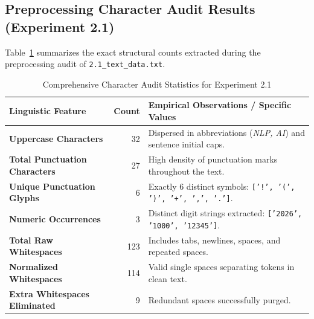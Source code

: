 \subsection{Preprocessing Character Audit Results (Experiment 2.1)}
Table~\ref{tab:exp2_audit_results} summarizes the exact structural counts extracted during the preprocessing audit of \texttt{2.1\_text\_data.txt}.
\begin{table}[H]
\centering
\small
\caption{Comprehensive Character Audit Statistics for Experiment 2.1}
\label{tab:exp2_audit_results}
\begin{tabular}{lrl}
\toprule
\textbf{Linguistic Feature} & \textbf{Count} & \textbf{Empirical Observations / Specific Values} \\
\midrule
\textbf{Uppercase Characters} & 32 & Dispersed in abbreviations (\textit{NLP, AI}) and sentence initial caps. \\
\textbf{Total Punctuation Characters} & 27 & High density of punctuation marks throughout the text. \\
\textbf{Unique Punctuation Glyphs} & 6 & Exactly 6 distinct symbols: \texttt{['!', '(', ')', '+', ',', '.']}. \\
\textbf{Numeric Occurrences} & 3 & Distinct digit strings extracted: \texttt{['2026', '1000', '12345']}. \\
\textbf{Total Raw Whitespaces} & 123 & Includes tabs, newlines, spaces, and repeated spaces. \\
\textbf{Normalized Whitespaces} & 114 & Valid single spaces separating tokens in clean text. \\
\textbf{Extra Whitespaces Eliminated} & 9 & Redundant spaces successfully purged. \\
\bottomrule
\end{tabular}
\end{table}

